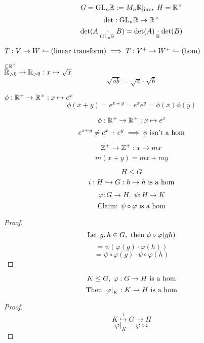 \documentclass[12pt]{article}
\begin{document}
\bboxexam
\begin{exam}
    \[
        G=\mathrm{GL}_n\mathbb R:=M_n\mathbb R|_{\mathrm{inv}},\;H=\mathbb R^\times
    \]
    \[
        \det:\mathrm{GL}_n\mathbb R\to\mathbb R^\times
    \]
    \[
        \det(A\underset{\mathrm{GL}_n\mathbb R}\cdot B)
        =\det(A)\underset{\mathbb R}\cdot\det(B)
    \]
\end{exam}
\ebox

\bboxexam
\begin{exam}
    \(T:V\to W\leftharpoonup(\mathrm{linear\ transform})\implies
    T:V^+\to W^+\leftharpoonup(\mathrm{hom})\)
\end{exam}
\ebox

\bboxexam
\begin{exam}
    \(\overset{\subseteq\mathbb R^\times}{\mathbb R_{>0}}\to\mathbb R_{>0}:x\mapsto\sqrt{x}\)
    \[
        \sqrt{ab}=\sqrt{a}\cdot\sqrt{b}
    \]
\end{exam}
\ebox

\bboxexam
\begin{exam}
    \(\phi:\mathbb R^+\to\mathbb R^\times:x\mapsto e^x\)
    \[
        \phi(x+y)=e^{x+y}=e^xe^y=\phi(x)\phi(y)
    \]
\end{exam}
\ebox

\bboxexam
\begin{exam}
    \[
        \phi:\mathbb R^+\to\mathbb R^+:x\mapsto e^x
    \]
    \[
        e^{x+y}\neq e^x+e^y\implies\phi\text{ isn't a hom}
    \]
\end{exam}
\ebox

\bboxexam
\begin{exam}
    \[
        \mathbb Z^+\to\mathbb Z^+:x\mapsto mx
    \]
    \[
        m(x+y)=mx+my
    \]
\end{exam}
\ebox


\bboxexam
\begin{exam}
    \[
        H\le G
    \]
    \[
        i:H\hookrightarrow G:h\mapsto h\text{ is a hom}
    \]
\end{exam}
\ebox

\bboxexam
\begin{exam}
    \[
        \varphi:G\to H,\;\psi:H\to K
    \]
    \[
        \text{Claim: }\psi\circ\varphi\text{ is a hom}
    \]
    \bboxproof
    \begin{proof}
        \[
            \text{Let }g,h\in G,\text{ then }\phi\circ\varphi(gh)
        \]
        \[
            =\psi(\varphi(g)\cdot\varphi(h))
        \]
        \[
            =\psi\circ\varphi(g)\cdot\psi\circ\varphi(h)
        \]
    \end{proof}
    \ebox
\end{exam}
\ebox

\bboxexam
\begin{exam}
    \[
        K\le G,\;\varphi:G\to H\text{ is a hom}
    \]
    \[
        \text{Then }\left.\varphi\right|_K:K\to H\text{ is a hom}
    \]
    \bboxproof
    \begin{proof}
        \[
            K\overset i\hookrightarrow G\to H
        \]
        \[
            \varphi|_K=\varphi\circ i
        \]
    \end{proof}
    \ebox
\end{exam}
\ebox
\end{document}
